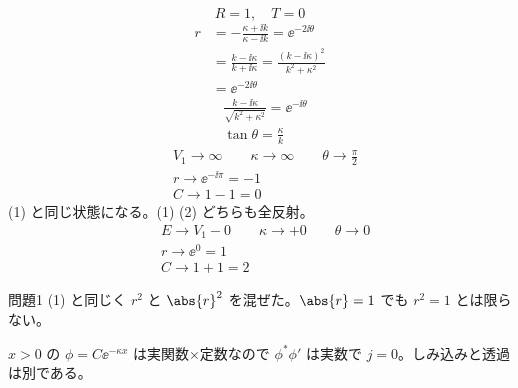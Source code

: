 \[ R=1,\quad T=0 \]
\begin{align*}
r&=-\frac{\kappa+\ii k}{\kappa-\ii k}=\ee^{-2\ii\theta}\\
&=\frac{k-\ii\kappa}{k+\ii\kappa}=\frac{(k-\ii\kappa)^{2}}{k^{2}+\kappa^{2}}\\
&=\ee^{-2\ii\theta}
\end{align*}
\begin{align*}
&\frac{k-\ii\kappa}{\sqrt{k^{2}+\kappa^{2}}}=\ee^{-\ii\theta}\\
&\tan\theta=\frac{\kappa}{k}
\end{align*}
\begin{align*}
&V_{1}\to\infty\qquad\kappa\to\infty\qquad\theta\to\frac{\pi}{2}\\
&r\to\ee^{-\ii\pi}=-1\\
&C\to1-1=0
\end{align*}
(1) と同じ状態になる。(1) (2) どちらも全反射。
\begin{align*}
&E\to V_{1}-0\qquad\kappa\to+0\qquad\theta\to0\\
&r\to\ee^{0}=1\\
&C\to1+1=2
\end{align*}
\item {} 問題1 (1) と同じく $r^{2}$ と $\abs{r}^{2}$ を混ぜた。$\abs{r}=1$ でも $r^{2}=1$ とは限らない。
\item $x>0$ の $\phi=C\ee^{-\kappa x}$ は実関数×定数なので $\phi^{*}\phi'$ は実数で $j=0$。しみ込みと透過は別である。
